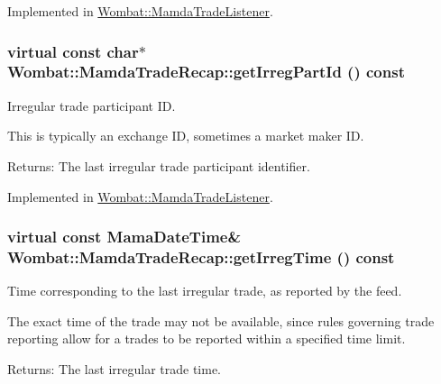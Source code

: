 Implemented in \hyperlink{classWombat_1_1MamdaTradeListener_9af4b2845a866803636bdd1983940a28}{Wombat::Mamda\-Trade\-Listener}.\hypertarget{classWombat_1_1MamdaTradeRecap_0b7056cac747d7dad3679df840219adc}{
\subsubsection[getIrregPartId]{\setlength{\rightskip}{0pt plus 5cm}virtual const char$\ast$ Wombat::Mamda\-Trade\-Recap::get\-Irreg\-Part\-Id () const}}
\label{classWombat_1_1MamdaTradeRecap_0b7056cac747d7dad3679df840219adc}


Irregular trade participant ID. 

This is typically an exchange ID, sometimes a market maker ID.

\begin{Desc}
\item[Returns:]The last irregular trade participant identifier. \end{Desc}


Implemented in \hyperlink{classWombat_1_1MamdaTradeListener_a8ee06db46d55e03adf400ade37b18e1}{Wombat::Mamda\-Trade\-Listener}.\hypertarget{classWombat_1_1MamdaTradeRecap_3583496cc2f74b2b1537176b8d91f5d9}{
\subsubsection[getIrregTime]{\setlength{\rightskip}{0pt plus 5cm}virtual const Mama\-Date\-Time\& Wombat::Mamda\-Trade\-Recap::get\-Irreg\-Time () const}}
\label{classWombat_1_1MamdaTradeRecap_3583496cc2f74b2b1537176b8d91f5d9}


Time corresponding to the last irregular trade, as reported by the feed. 

The exact time of the trade may not be available, since rules governing trade reporting allow for a trades to be reported within a specified time limit.

\begin{Desc}
\item[Returns:]The last irregular trade time. \end{Desc}


